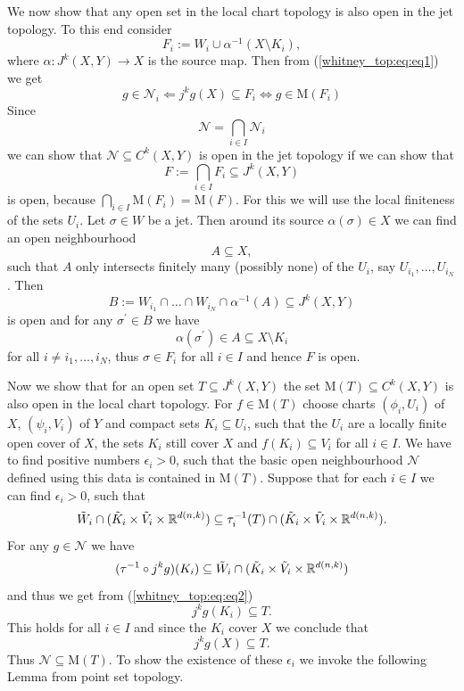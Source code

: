 We now show that any open set in the local chart topology is also open in the jet topology. To this end consider 
\[
F_i := W_i \cup \alpha^{-1}(X \setminus K_i),
\]
where $\alpha \colon J^k(X,Y) \to X$ is the source map. Then from (\ref{whitney_top:eq:eq1}) we get 
\[
g \in \mathcal{N} _i \Leftarrow j^kg(X) \subseteq F_i \Leftrightarrow g \in \mathrm{M}(F_i)
\]
Since 
\[
\mathcal{N} = \bigcap_{i \in I} \mathcal{N} _i
\]
we can show that $\mathcal{N} \subseteq C^k(X,Y)$ is open in the jet topology if we can show that 
\[
F := \bigcap_{i \in I} F_i \subseteq J^k(X,Y)
\] 
is open, because $\bigcap_{i \in I} \mathrm{M}(F_i) = \mathrm{M}(F)$. For this we will use the local finiteness of the sets $U_i$. Let $\sigma \in W$ be a jet. Then around its source $\alpha(\sigma) \in X$ we can find an open neighbourhood
\[
A \subseteq X,
\]
such that $A$ only intersects finitely many (possibly none) of the $U_i$, say $U_{i_1}, \ldots, U_{i_N}$. Then 
\[
B:= W_{i_1} \cap \ldots \cap W_{i_N} \cap \alpha^{-1}(A) \subseteq J^k(X,Y) 
\] 
is open and for any $\sigma^\prime \in B$ we have 
\[
\alpha(\sigma^\prime) \in A \subseteq X \setminus K_i 
\]
for all $i \neq i_1,\ldots,i_N$, thus $\sigma \in F_i$ for all $i \in I$ and hence $F$ is open.

Now we show that for an open set $T \subseteq J^k(X,Y)$ the set $\mathrm{M}(T) \subseteq C^k(X,Y)$ is also open in the local chart topology. For $f \in \mathrm{M}(T)$ choose charts $(\phi_i,U_i)$ of $X$, $(\psi_i,V_i)$ of $Y$ and compact sets $K_i \subseteq U_i$, such that the $U_i$ are a locally finite open cover of $X$, the sets $K_i$ still cover $X$ and $f(K_i) \subseteq V_i$ for all $i \in I$. We have to find positive numbers $\epsilon_i > 0$, such that the basic open neighbourhood $\mathcal{N}$ defined using this data is contained in $\mathrm{M}(T)$. Suppose that for each $i \in I$ we can find $\epsilon_i >0$, such that 
\begin{equation}
    \label{whitney_top:eq:eq2}
    \tilde{W}_i \cap (\tilde{K}_i \times \tilde{V}_i \times \mathbb{R}^{d(n,k)}) \subseteq \tau_i^{-1}(T) \cap (\tilde{K}_i \times \tilde{V}_i \times \mathbb{R}^{d(n,k)}).
\end{equation}
For any $g \in \mathcal{N}$ we have 
\[
(\tau^{-1}\circ j^kg)(K_i) \subseteq \tilde{W}_i \cap (\tilde{K}_i \times \tilde{V}_i \times \mathbb{R}^{d(n,k)}) 
\]
and thus we get from (\ref{whitney_top:eq:eq2})
\[
j^kg(K_i) \subseteq T.
\] 
This holds for all $i \in I$ and since the $K_i$ cover $X$ we conclude that 
\[
j^kg(X) \subseteq T.
\]
Thus $\mathcal{N} \subseteq \mathrm{M}(T)$. To show the existence of these $\epsilon_i$ we invoke the following Lemma from point set topology.

